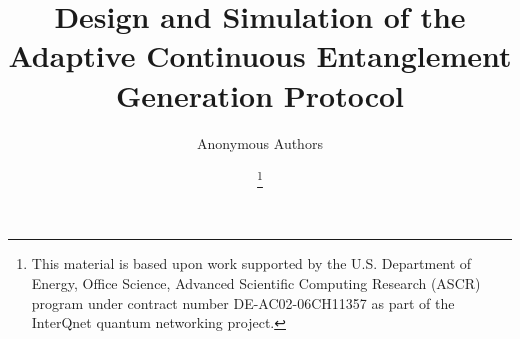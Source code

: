 \documentclass[conference]{IEEEtran}
\begin{document}

\title{Design and Simulation of the Adaptive Continuous Entanglement Generation Protocol}

\author{Anonymous Authors}

\author{


\thanks{This material is based upon work supported by the U.S. Department of Energy, Office Science, Advanced Scientific Computing Research (ASCR) program under contract number DE-AC02-06CH11357 as part of the InterQnet quantum networking project. 
}   
}


\maketitle











\end{document}
